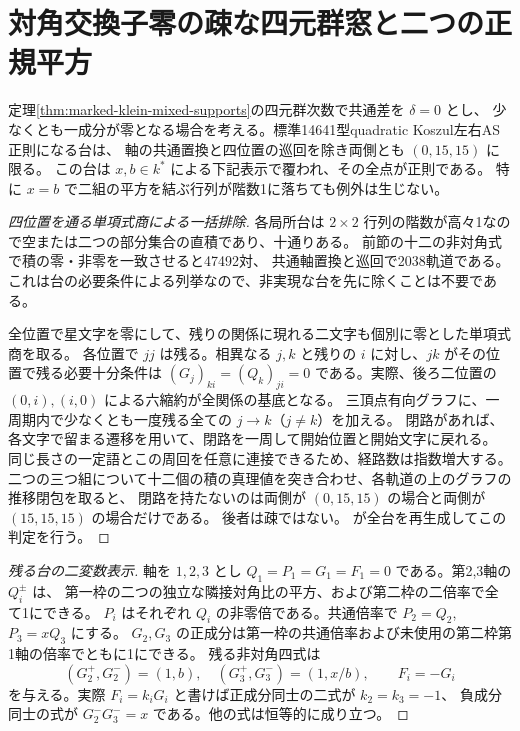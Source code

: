 \section{対角交換子零の疎な四元群窓と二つの正規平方}
\label{sec:marked-klein-zero-bracket-boundary}
\begin{theorem}\label{thm:marked-klein-zero-bracket-boundary}
定理\ref{thm:marked-klein-mixed-supports}の四元群次数で共通差を $\delta=0$ とし、
少なくとも一成分が零となる場合を考える。標準14641型quadratic Koszul左右AS正則になる台は、
軸の共通置換と四位置の巡回を除き両側とも $(0,15,15)$ に限る。
この台は $x,b\in k^*$ による下記表示で覆われ、その全点が正則である。
特に $x=b$ で二組の平方を結ぶ行列が階数1に落ちても例外は生じない。
\end{theorem}

\begin{proof}[四位置を通る単項式商による一括排除]
各局所台は $2\times2$ 行列の階数が高々1なので空または二つの部分集合の直積であり、十通りある。
前節の十二の非対角式で積の零・非零を一致させると47492対、
共通軸置換と巡回で2038軌道である。
これは台の必要条件による列挙なので、非実現な台を先に除くことは不要である。

全位置で星文字を零にして、残りの関係に現れる二文字も個別に零とした単項式商を取る。
各位置で $jj$ は残る。相異なる $j,k$ と残りの $i$ に対し、$jk$ がその位置で残る必要十分条件は
$(G_j)_{ki}=(Q_k)_{ji}=0$ である。実際、後ろ二位置の $(0,i),(i,0)$ による六縮約が全関係の基底となる。
三頂点有向グラフに、一周期内で少なくとも一度残る全ての $j\to k$（$j\ne k$）を加える。
閉路があれば、各文字で留まる遷移を用いて、閉路を一周して開始位置と開始文字に戻れる。
同じ長さの一定語とこの周回を任意に連接できるため、経路数は指数増大する。
二つの三つ組について十二個の積の真理値を突き合わせ、各軌道の上のグラフの推移閉包を取ると、
閉路を持たないのは両側が $(0,15,15)$ の場合と両側が $(15,15,15)$ の場合だけである。
後者は疎ではない。 が全台を再生成してこの判定を行う。
\end{proof}

\begin{proof}[残る台の二変数表示]
軸を $1,2,3$ とし $Q_1=P_1=G_1=F_1=0$ である。第2,3軸の $Q_i^\pm$ は、
第一枠の二つの独立な隣接対角比の平方、および第二枠の二倍率で全て1にできる。
$P_i$ はそれぞれ $Q_i$ の非零倍である。共通倍率で $P_2=Q_2$, $P_3=xQ_3$ にする。
$G_2,G_3$ の正成分は第一枠の共通倍率および未使用の第二枠第1軸の倍率でともに1にできる。
残る非対角四式は
\[
 (G_2^+,G_2^-)=(1,b),\quad (G_3^+,G_3^-)=(1,x/b),\qquad F_i=-G_i
\]
を与える。実際 $F_i=k_iG_i$ と書けば正成分同士の二式が $k_2=k_3=-1$、
負成分同士の式が $G_2^-G_3^-=x$ である。他の式は恒等的に成り立つ。
\end{proof}


